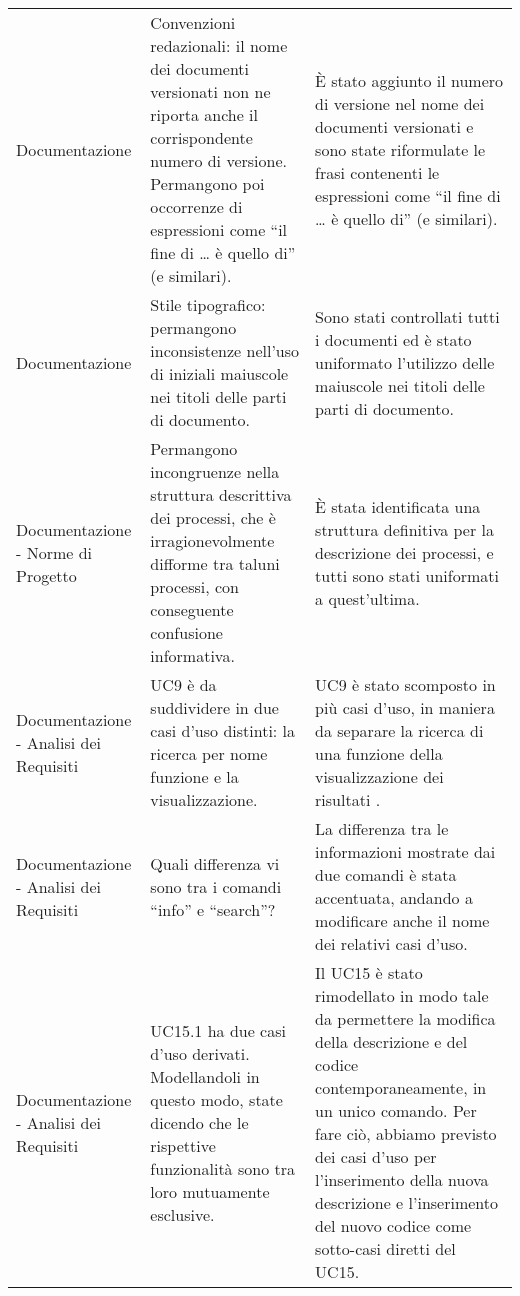 \begin{longtable}{ 
				>{\centering}p{} 
				>{\centering}p{}
				>{\centering\arraybackslash}p{}}
				Documentazione
					&
				Convenzioni redazionali: il nome dei documenti versionati non ne riporta anche il corrispondente numero di versione. Permangono poi occorrenze di espressioni come “il fine di … è quello di” (e similari). 
					&
				È stato aggiunto il numero di versione nel nome dei documenti versionati e sono state riformulate le frasi contenenti le  espressioni come “il fine di … è quello di” (e similari).
					\\
					
				Documentazione
					&
				Stile tipografico: permangono inconsistenze nell’uso di iniziali maiuscole nei titoli delle parti di documento. 
					&
				Sono stati controllati tutti i documenti ed è stato uniformato l'utilizzo delle maiuscole nei titoli delle parti di documento.
					\\
					
				Documentazione - Norme di Progetto
					&
				Permangono incongruenze nella struttura descrittiva dei processi, che è irragionevolmente difforme tra taluni processi, con conseguente confusione informativa.
					&
				È stata identificata una struttura definitiva per la descrizione dei processi, e tutti sono stati uniformati a quest’ultima.
					\\
					
				Documentazione - Analisi dei Requisiti
					&
				UC9 è da suddividere in due casi d’uso distinti: la ricerca per nome funzione e la visualizzazione. 
					&
				UC9 è stato scomposto in più casi d’uso, in maniera da separare la ricerca di una funzione della visualizzazione dei risultati  .
					\\
					
				Documentazione - Analisi dei Requisiti
					&
				Quali differenza vi sono tra i comandi “info” e “search”? 
					&
				La differenza tra le informazioni mostrate dai due comandi è stata accentuata, andando a modificare anche il nome dei relativi casi d’uso.
					\\
					
				Documentazione - Analisi dei Requisiti
					&
				UC15.1 ha due casi d’uso derivati. Modellandoli in questo modo, state dicendo che le rispettive funzionalità sono tra loro mutuamente esclusive. 
					&
				Il UC15 è stato rimodellato in modo tale da permettere la modifica della descrizione e del codice contemporaneamente, in un unico comando. Per fare ciò, abbiamo previsto dei casi d’uso per l’inserimento della nuova descrizione e l’inserimento del nuovo codice come sotto-casi diretti del UC15.
					\\
					

\end{longtable}
